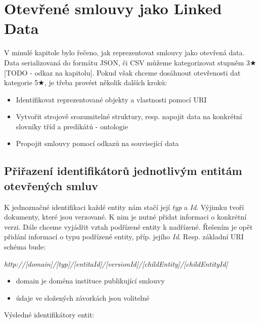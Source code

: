 \chapter{Otevřené smlouvy jako Linked Data}

V minulé kapitole bylo řečeno, jak reprezentovat smlouvy jako otevřená data. Data serializovaná do formátu JSON, či CSV můžeme kategorizovat stupněm 3$\bigstar$[TODO - odkaz na kapitolu]. Pokud však chceme dosáhnout otevřenosti dat kategorie 5$\bigstar$, je třeba provést několik dalších kroků:

\begin{itemize}
\item Identifikovat reprezentované objekty a vlastnosti pomocí URI
\item Vytvořit strojově srozumitelné struktury, resp. napojit data na konkrétní slovníky tříd a predikátů - ontologie
\item Propojit smlouvy pomocí odkazů na související data
\end{itemize}

\section{Přiřazení identifikátorů jednotlivým entitám otevřených smluv}

K jednoznačné identifikaci každé entity nám stačí její \textit{typ} a \textit{Id}. Výjimku tvoří dokumenty, které jsou verzované. K nim je nutné přidat informaci o konkrétní verzi. Dále chceme vyjádřit vztah podřízené entity k nadřízené. Řešením je opět přidání informací o typu podřízené entity, příp. jejího \textit{Id}. Resp. základní URI schéma bude:

\bigskip

\textit{http://[domain]/[typ]/[entitaId]/{[versionId]}/{[childEntity]}/{[childEntityId]}}
\begin{itemize}
\item domain je doména instituce publikující smlouvy
\item údaje ve složených závorkách jsou volitelné
\end{itemize}

\medskip
\noindent
Výsledné identifikátory entit:

